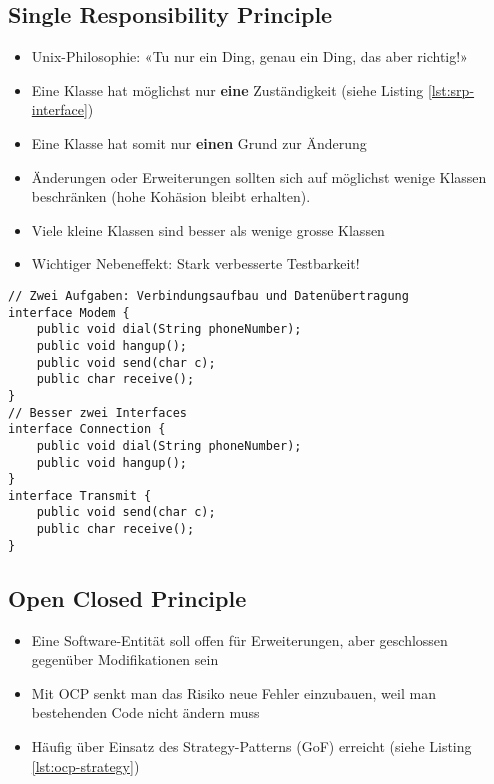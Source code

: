 \newpage

\subsection{Single Responsibility Principle}

\begin{itemize}
	\item Unix-Philosophie: «Tu nur ein Ding, genau ein Ding, das aber richtig!»
	\item Eine Klasse hat möglichst nur \textbf{eine} Zuständigkeit (siehe Listing \ref{lst:srp-interface})
	\item Eine Klasse hat somit nur \textbf{einen} Grund zur Änderung
	\item Änderungen oder Erweiterungen sollten sich auf möglichst wenige Klassen beschränken (hohe Kohäsion bleibt erhalten).
	\item Viele kleine Klassen sind besser als wenige grosse Klassen
	\item Wichtiger Nebeneffekt: Stark verbesserte Testbarkeit!
\end{itemize}

\begin{lstlisting}[caption={Schlechtes Interface nach SRP},label=lst:srp-interface]
// Zwei Aufgaben: Verbindungsaufbau und Datenübertragung
interface Modem {
	public void dial(String phoneNumber);
	public void hangup();
	public void send(char c);
	public char receive();
}
// Besser zwei Interfaces
interface Connection {
	public void dial(String phoneNumber);
	public void hangup();
}
interface Transmit {
	public void send(char c);
	public char receive();
}
\end{lstlisting}

\subsection{Open Closed Principle}

\begin{itemize}
	\item Eine Software-Entität soll offen für Erweiterungen, aber geschlossen gegenüber Modifikationen sein
	\item Mit OCP senkt man das Risiko neue Fehler einzubauen, weil man bestehenden Code nicht ändern muss
	\item Häufig über Einsatz des Strategy-Patterns (GoF) erreicht (siehe Listing \ref{lst:ocp-strategy})
\end{itemize}

